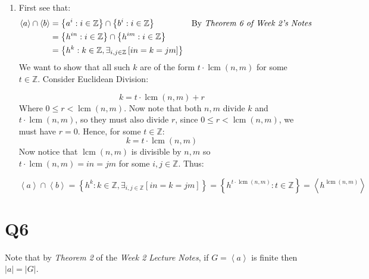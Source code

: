 \documentclass[a4paper, 11pt]{article}
\newcommand{\ZZ}{\mathbb{Z}}
\def\set#1{\left\{ #1 \right\}}
\def\gen#1{\left\langle#1 \right\rangle}
\begin{document}
\begin{enumerate}[label=(\alph*)]
	\item First see that: 
	\begin{align*}
		\gen{a}\cap\gen{b} 
		&= \set{a^i:i\in\ZZ}\cap\set{b^i:i\in\ZZ}                       & 
		\text{By \textit{Theorem 6 of Week 2's Notes}}   \\ 
		&= \set{h^{in}:i\in\ZZ}\cap\set{h^{im}:i\in\ZZ}                 &   \\ 
		&= \set{h^k:k\in\ZZ, \exists_{i,j\in\ZZ}\left[ in=k=jm \right]} & 
	\end{align*}
	We want to show that all such $k$ are of the form $t\cdot\operatorname{lcm}(n,m)$ for some $t\in\ZZ$. Consider Euclidean Division: 
	

	\[
		k = t\cdot\operatorname{lcm}(n,m) + r 	
	\]
	Where $0\leq r< \operatorname{lcm}(n,m)$. Now note that both $n,m$ divide $k$ and $t\cdot\operatorname{lcm}(n,m)$, so they must also divide $r$, since $0\leq r<\operatorname{lcm}(n,m)$, we must have $r=0$.  Hence, for some $t\in\ZZ$:
	\[
		k=t\cdot\operatorname{lcm}(n,m)
	\] 
	Now notice that $\operatorname{lcm}(n,m)$ is divisible by $n,m$ so $t\cdot \operatorname{lcm}(n,m)=in=jm$ for some $i,j\in\ZZ$. Thus: 

	\[
		\gen{a}\cap\gen{b} 
		= \set{h^k:k\in\ZZ, \exists_{i,j\in\ZZ}\left[ in=k=jm \right] }
		= \set{h^{t\cdot\operatorname{lcm}(n,m)}:t\in\ZZ}
		= \gen{h^{\operatorname{lcm}(n,m)}}
	\]

\end{enumerate}

\pagebreak
\section*{Q6}
Note that by \textit{Theorem 2} of the \textit{Week 2 Lecture Notes}, if $G=\gen{a}$ is finite then $|a|=|G|$. 
\end{document}
